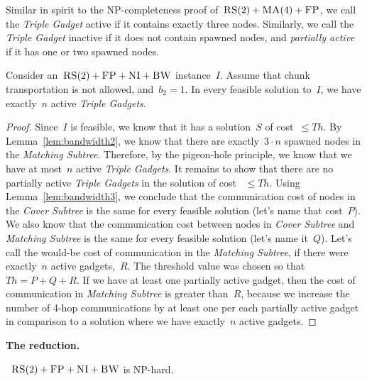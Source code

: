 \documentclass[preprint,12pt]{elsarticle}
\newcommand{\CC}{\textsc{NI}}
\newcommand{\FP}{\textsc{FP}}
\newcommand{\RS}{\textsc{RS}}
\newcommand{\BW}{\textsc{BW}}
\newcommand{\MA}{\textsc{MA}}
\newcommand{\MatchSubtree}{{\emph{Matching Subtree}}}
\newcommand{\CoverSubtree}{{\emph{Cover Subtree}}}
\newcommand{\TripleGadget}{{\emph{Triple Gadget}}}
\newcommand{\TripleGadgets}{{\emph{Triple Gadgets}}}
\newcommand{\CostCom}{\ensuremath{b_2}}
\newcommand{\Thr}{\ensuremath{Th}}
\newcommand{\Sol}{\ensuremath{S}}
\begin{document}
Similar in spirit to the NP-completeness proof of~$\RS(2)+\MA(4)+\FP$,
we call the {\TripleGadget} active if it contains exactly three nodes. 
Similarly, we call the {\TripleGadget} inactive if it
does not contain spawned nodes, and \emph{partially active} if it
has one or two
spawned nodes.

\begin{lemma}
  Consider an~$\RS(2)+\FP+\CC+\BW$ instance~$I$.  Assume that 
  chunk transportation is not allowed, and~$\CostCom = 1$.
  In every feasible solution to~$I$, we have exactly~$n$ active
  {\TripleGadgets}.
  \label{lem:full-or-empty}
\end{lemma}

\begin{proof}
  Since~$I$ is feasible, we know that it has a solution~$\Sol$ of
  cost~$\leq \Thr$.
  By Lemma~\ref{lem:bandwidth2}, we know that there are
  exactly~$3\cdot n$ spawned nodes in the {\MatchSubtree}. Therefore, by
  the pigeon-hole principle, we know that we have at most~$n$
  active {\TripleGadgets}. It remains to show that there
  are no partially active {\TripleGadgets} in the solution of cost
 ~$\leq \Thr$.
  Using Lemma~\ref{lem:bandwidth3}, 
  we conclude that the communication cost of
  nodes in the {\CoverSubtree} is the same for every feasible solution
  (let's name that cost~$P$). We also know that the communication cost
  between nodes in {\CoverSubtree} and {\MatchSubtree} is the same for
  every feasible solution (let's name it~$Q$). Let's call the
  would-be cost of communication in the {\MatchSubtree}, if there were
  exactly~$n$ active gadgets,~$R$.
  The threshold value was chosen so that~$\Thr = P+Q+R$. If we have at least one partially active
  gadget, then the cost of communication in {\MatchSubtree} is greater
  than~$R$, because we increase the number of 4-hop communications by
  at least one per each partially active gadget in comparison to a solution
  where we have exactly~$n$ active gadgets.
\end{proof}

\noindent \textbf{The reduction.}

\begin{theorem}
 ~$\RS(2)+\FP+\CC+\BW$ is NP-hard.
\end{theorem}
\end{document}
